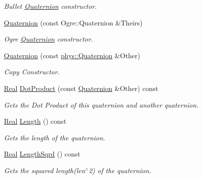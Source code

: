 \begin{DoxyCompactItemize}
\begin{DoxyCompactList}\small\item\em Bullet \hyperlink{classphys_1_1Quaternion}{Quaternion} constructor. \item\end{DoxyCompactList}\item 
\hyperlink{classphys_1_1Quaternion_a4902c05489ebae03a55433d947c53d03}{Quaternion} (const Ogre::Quaternion \&Theirs)
\begin{DoxyCompactList}\small\item\em Ogre \hyperlink{classphys_1_1Quaternion}{Quaternion} constructor. \item\end{DoxyCompactList}\item 
\hyperlink{classphys_1_1Quaternion_a46d08f43b0b638a256344b3919ba9e0d}{Quaternion} (const \hyperlink{classphys_1_1Quaternion}{phys::Quaternion} \&Other)
\begin{DoxyCompactList}\small\item\em Copy Constructor. \item\end{DoxyCompactList}\item 
\hyperlink{namespacephys_af7eb897198d265b8e868f45240230d5f}{Real} \hyperlink{classphys_1_1Quaternion_a249938e4221bf91c0853d7ff28b42392}{DotProduct} (const \hyperlink{classphys_1_1Quaternion}{Quaternion} \&Other) const 
\begin{DoxyCompactList}\small\item\em Gets the Dot Product of this quaternion and another quaternion. \item\end{DoxyCompactList}\item 
\hyperlink{namespacephys_af7eb897198d265b8e868f45240230d5f}{Real} \hyperlink{classphys_1_1Quaternion_aaa860619e9370244d1b538dd9aaf0efc}{Length} () const 
\begin{DoxyCompactList}\small\item\em Gets the length of the quaternion. \item\end{DoxyCompactList}\item 
\hyperlink{namespacephys_af7eb897198d265b8e868f45240230d5f}{Real} \hyperlink{classphys_1_1Quaternion_ac81b52051cc7dcb73fa01fb963d068a6}{LengthSqrd} () const 
\begin{DoxyCompactList}\small\item\em Gets the squared length(len$^\wedge$2) of the quaternion. \item\end{DoxyCompactList}\item 

\end{DoxyCompactItemize}
